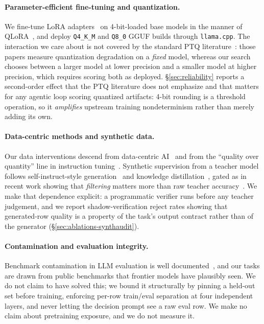 \documentclass[sigconf,10pt]{acmart}
\newcommand{\xref}[1]{\S\ref{#1}}
\begin{document}
\paragraph{Parameter-efficient fine-tuning and quantization.}
We fine-tune LoRA adapters~\cite{hu2021lora} on 4-bit-loaded base models in the manner of
QLoRA~\cite{dettmers2023qlora}, and deploy \texttt{Q4\_K\_M} and \texttt{Q8\_0} GGUF builds
through \texttt{llama.cpp}. The interaction we care about is not covered by the standard
PTQ literature~\cite{frantar2022gptq,lin2024awq,dettmers2022llmint8}: those papers measure
quantization degradation on a \emph{fixed} model, whereas our search chooses between a larger
model at lower precision and a smaller model at higher precision, which requires scoring both
as deployed. \xref{sec:reliability} reports a second-order effect that the PTQ literature
does not emphasize and that matters for any agentic loop scoring quantized artifacts:
4-bit rounding is a threshold operation, so it \emph{amplifies} upstream training
nondeterminism rather than merely adding its own.

\paragraph{Data-centric methods and synthetic data.}
Our data interventions descend from data-centric AI~\cite{northcutt2021confident,
mazumder2023dataperf} and from the ``quality over quantity'' line in instruction
tuning~\cite{zhou2023lima}. Synthetic supervision from a teacher model follows
self-instruct-style generation~\cite{wang2023selfinstruct} and knowledge
distillation~\cite{hinton2015distilling}, gated as in recent work showing that
\emph{filtering} matters more than raw teacher accuracy~\cite{bansal2025smallerweaker}.
We make that dependence explicit: a programmatic verifier runs before any teacher
judgement, and we report shadow-verification reject rates showing that generated-row
quality is a property of the task's output contract rather than of the generator
(\xref{sec:ablations-synthaudit}).

\paragraph{Contamination and evaluation integrity.}
Benchmark contamination in LLM evaluation is well
documented~\cite{sainz2023nlpcontamination,golchin2024timetravel}, and our tasks are drawn
from public benchmarks that frontier models have plausibly seen. We do not claim to have
solved this; we bound it structurally by pinning a held-out set before training, enforcing
per-row train/eval separation at four independent layers, and never letting the decision
prompt see a raw eval row. We make no claim about pretraining exposure, and we do not
measure it.
\end{document}
